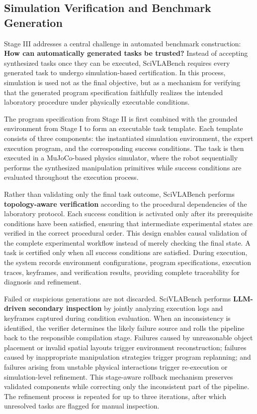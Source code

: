 \documentclass[sigconf]{acmart}
\begin{document}
\subsection{Simulation Verification and Benchmark Generation}
\label{sec:simulation-verification}

Stage III addresses a central challenge in automated benchmark construction: \textbf{How can automatically generated tasks be trusted?} Instead of accepting synthesized tasks once they can be executed, SciVLABench requires every generated task to undergo simulation-based certification. In this process, simulation is used not as the final objective, but as a mechanism for verifying that the generated program specification faithfully realizes the intended laboratory procedure under physically executable conditions.

The program specification from Stage II is first combined with the grounded environment from Stage I to form an executable task template. Each template consists of three components: the instantiated simulation environment, the expert execution program, and the corresponding success conditions. The task is then executed in a MuJoCo-based physics simulator, where the robot sequentially performs the synthesized manipulation primitives while success conditions are evaluated throughout the execution process.

Rather than validating only the final task outcome, SciVLABench performs \textbf{topology-aware verification} according to the procedural dependencies of the laboratory protocol. Each success condition is activated only after its prerequisite conditions have been satisfied, ensuring that intermediate experimental states are verified in the correct procedural order. This design enables causal validation of the complete experimental workflow instead of merely checking the final state. A task is certified only when all success conditions are satisfied. During execution, the system records environment configurations, program specifications, execution traces, keyframes, and verification results, providing complete traceability for diagnosis and refinement.

Failed or suspicious generations are not discarded. SciVLABench performs \textbf{LLM-driven secondary inspection} by jointly analyzing execution logs and keyframes captured during condition evaluation. When an inconsistency is identified, the verifier determines the likely failure source and rolls the pipeline back to the responsible compilation stage. Failures caused by unreasonable object placement or invalid spatial layouts trigger environment reconstruction; failures caused by inappropriate manipulation strategies trigger program replanning; and failures arising from unstable physical interactions trigger re-execution or simulation-level refinement. This stage-aware rollback mechanism preserves validated components while correcting only the inconsistent part of the pipeline. The refinement process is repeated for up to three iterations, after which unresolved tasks are flagged for manual inspection.
\end{document}
